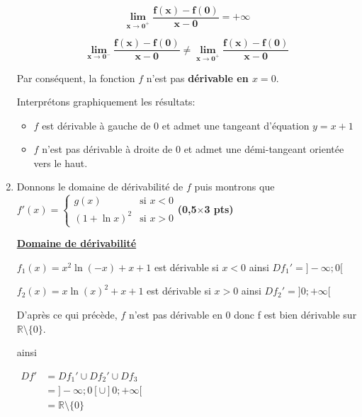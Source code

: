 \documentclass[12pt,a4paper]{article}
\begin{document}
\begin{enumerate}
          \begin{resultbox}
              \[
                  \mathbf{\lim\limits_{x \to 0^+}\frac{f(x)-f(0)}{x-0}=+\infty
                  }
              \]
          \end{resultbox}

          \begin{resultbox}
              \[
                  \mathbf{\lim\limits_{x \to 0^-}\frac{f(x)-f(0)}{x-0} \neq \lim\limits_{x \to 0^+}\frac{f(x)-f(0)}{x-0}
                  }
              \]
          \end{resultbox}

          Par conséquent, la fonction \( f \) n'est pas \textbf{dérivable en \( x = 0 \)}.

          Interprétons graphiquement les résultats:

          \begin{itemize}
          \item \( f \) est dérivable à gauche de \(0\)  et admet une tangeant d'équation \( y=x+1 \)
          \item \( f \) n'est pas dérivable à droite de \(0\)  et admet une démi-tangeant orientée vers le haut.
          \end{itemize}

    \item Donnons le domaine de dérivabilité de \( f \) puis montrons que
          \(
          f'(x) =
          \begin{cases}
              g(x)          & \text{si } x < 0 \\
              (1 + \ln x)^2 & \text{si } x > 0
          \end{cases}
          \)\hfill \textbf{(0,5$\times$3 pts)}

          \textbf{\underline{Domaine de dérivabilité}}

          \( f_{1}(x)=x^2 \ln(-x) + x + 1 \) est dérivable si \( x < 0 \) ainsi \( Df_{1}' = ]-\infty;0[\)

          \( f_{2}(x)=x \ln(x)^2 + x + 1  \) est dérivable si \(  x > 0 \) ainsi \( Df_{2}' = ]0;+\infty[\)

          D'après ce qui précède, \(f\) n'est pas dérivable en \(0\)  donc f est bien dérivable sur \(\mathbb{R}\setminus\{0\}\).

          ainsi

          \(
          \begin{aligned}
              Df' & =Df_{1}' \cup Df_{2}' \cup Df_{3}         \\
                  & =]-\infty;0[ \cup ]0;+\infty[\\
                  & =\mathbb{R}\setminus\{0\}
          \end{aligned}
          \)


\end{enumerate}
\end{document}

